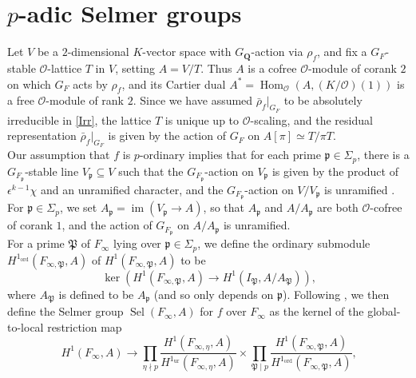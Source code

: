 \documentclass[12 pt]{amsart}
\theoremstyle{plain}
\theoremstyle{definition}
\numberwithin{equation}{section}
\numberwithin{table}{section}
\begin{document}
\section{$p$-adic Selmer groups}
\label{adic-selmer}
\indent Let $V$ be a $2$-dimensional $K$-vector space with $G_\mathbf{Q}$-action via $\rho_f$, and fix a $G_F$-stable $\mathscr{O}$-lattice $T$ in $V$, setting $A=V/T$. Thus $A$ is a cofree $\mathscr{O}$-module of corank $2$ on which $G_F$ acts by $\rho_f$, and its Cartier dual $A^*=\operatorname{Hom}_\mathscr{O}(A,(K/\mathscr{O})(1))$ is a free $\mathscr{O}$-module of rank $2$. Since we have assumed $\bar{\rho}_f\vert_{G_F}$ to be absolutely irreducible in \cref{Irr}, the lattice $T$ is unique up to $\mathscr{O}$-scaling, and the residual representation $\bar{\rho}_f\vert_{G_F}$ is given by the action of $G_F$ on $A[\pi]\simeq T/\pi T$.\\%
\indent Our assumption that $f$ is $p$-ordinary implies that for each prime $\mathfrak{p}\in\Sigma_p$, there is a $G_{F_\mathfrak{p}}$-stable line $V_\mathfrak{p}\subseteq V$ such that the $G_{F_\mathfrak{p}}$-action on $V_\mathfrak{p}$ is given by the product of $\epsilon^{k-1}\chi$ and an unramified character, and the $G_{F_\mathfrak{p}}$-action on $V/V_\mathfrak{p}$ is unramified \cite[\S 4.1]{EPW}. For $\mathfrak{p}\in\Sigma_p$, we set $A_\mathfrak{p}=\operatorname{im}(V_\mathfrak{p}\rightarrow A)$, so that $A_\mathfrak{p}$ and $A/A_\mathfrak{p}$ are both $\mathscr{O}$-cofree of corank $1$, and the action of $G_{F_\mathfrak{p}}$ on $A/A_\mathfrak{p}$ is unramified.\\%
\indent For a prime $\mathfrak{P}$ of $F_\infty$ lying over $\mathfrak{p}\in\Sigma_p$, we define the ordinary submodule $H^1_\operatorname{ord}(F_{\infty,\mathfrak{P}},A)$ of $H^1(F_{\infty,\mathfrak{P}},A)$ to be
\begin{equation*}
\ker(H^1(F_{\infty,\mathfrak{P}},A)\rightarrow H^1(I_\mathfrak{P},A/A_\mathfrak{P}))\text{,}
\end{equation*}
where $A_\mathfrak{P}$ is defined to be  $A_\mathfrak{p}$ (and so only depends on $\mathfrak{p}$). Following \cite{GR89}, we then define the Selmer group $\operatorname{Sel}(F_\infty,A)$ for $f$ over $F_\infty$ as the kernel of the global-to-local restriction map
\begin{equation*}
H^1(F_\infty,A)\rightarrow\prod_{\eta\nmid p}\dfrac{H^1(F_{\infty,\eta},A)}{H^1_\operatorname{ur}(F_{\infty,\eta},A)}\times\prod_{\mathfrak{P}\mid p}\dfrac{H^1(F_{\infty,\mathfrak{P}},A)}{H^1_\operatorname{ord}(F_{\infty,\mathfrak{P}},A)}\text{,}
\end{equation*}
\end{document}
